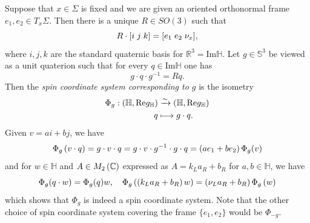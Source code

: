 \documentclass[openany, 11pt]{article}
\theoremstyle{definition}
\theoremstyle{remark}
\def\lp{\ensuremath{\left(}}
\def\rp{\ensuremath{\right)}}
\def\bC{\ensuremath{\mathbb{C}}}
\def\bH{\ensuremath{\mathbb{H}}}
\def\bR{\ensuremath{\mathbb{R}}}
\begin{document}
Suppose that $x\in\Sigma$ is fixed and we are given an oriented orthonormal frame $e_1,e_2\in T_x\Sigma$. Then there is a unique $R\in SO(3)$ such that 
\[
    R\cdot[i\hspace{.1cm} j\hspace{.1cm}k]=[e_1\hspace{.1cm}e_2\hspace{.1cm}\nu_x],
\]
where $i,j,k$ are the standard quaternic basis for $\bR^3=\text{Im}\bH$. Let $g\in \mathbb{S}^3$ be viewed as a unit quaterion such that for every $q\in \text{Im}\bH$ one has
\[
    g\cdot q\cdot g^{-1}=Rq.
\]
Then the \emph{spin coordinate system corresponding to $g$} is the isometry
\begin{align*}
    \Phi_g:\lp\bH,\text{Re}g_{\bH}\rp&\xrightarrow{\sim}\lp\bH,\text{Re}g_{\bH}\rp\\
    q&\longmapsto g\cdot q.
\end{align*}
Given $v=ai+bj$, we have
\[
    \Phi_g\lp v\cdot q\rp=g\cdot v\cdot q=g\cdot v\cdot g^{-1}\cdot g\cdot q=\lp ae_1+be_2\rp\Phi_g(v)
\]
and for $w\in\bH$ and $A\in M_2\lp\bC\rp$ expressed as $A=k_La_R+b_R$ for $a,b\in\bH$, we have
\[
    \Phi_g(q\cdot w)=\Phi_g(q)w,\quad \Phi_g\lp\lp k_La_R+b_R\rp w \rp=\lp\nu_La_R+b_R\rp\Phi_g\lp w\rp
\]
which shows that $\Phi_g$ is indeed a spin coordinate system. Note that the other choice of spin coordinate system covering the frame $\{ e_1,e_2\}$ would be $\Phi_{-g}$.
\end{document}
